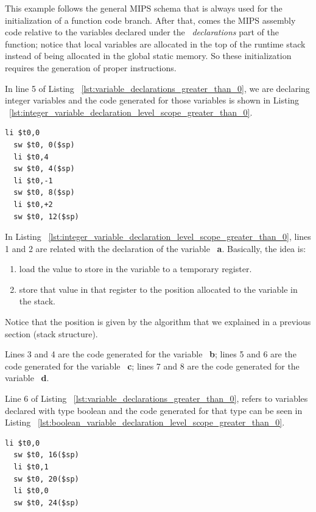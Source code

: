 \documentclass[
  oneside,
  11pt, a4paper,
  footinclude=true,
  headinclude=true,
  cleardoublepage=empty
]{scrbook}
\begin{document}
This example follows the general MIPS schema that is always used for the initialization of a function code branch. After that, comes the MIPS assembly code relative to the variables declared under the ~\textit{declarations} part of the function; notice that local variables are allocated in the top of the runtime stack instead of being allocated in the global static memory. So these initialization requires the generation of proper instructions.

In line 5 of Listing ~\ref{lst:variable_declarations_greater_than_0}, we are declaring integer variables and the code generated for those variables is shown in Listing ~\ref{lst:integer_variable_declaration_level_scope_greater_than_0}.

\begin{lstlisting}[caption={Declaring integer variables in level scope greater than 0 on MIPS.},label={lst:integer_variable_declaration_level_scope_greater_than_0}]
  li $t0,0		
  sw $t0, 0($sp)
  li $t0,4		
  sw $t0, 4($sp)
  li $t0,-1		
  sw $t0, 8($sp)
  li $t0,+2		
  sw $t0, 12($sp)
\end{lstlisting}

In Listing ~\ref{lst:integer_variable_declaration_level_scope_greater_than_0}, lines 1 and 2 are related with the declaration of the variable ~\textbf{a}. Basically, the idea is:

\begin{enumerate}
\item load the value to store in the variable to a temporary register.
\item store that value in that register to the position allocated to the variable in the stack.
\end{enumerate}

Notice that the position is given by the algorithm that we explained in a previous section (stack structure).

Lines 3 and 4 are the code generated for the variable ~\textbf{b}; lines 5 and 6 are the code generated for the variable ~\textbf{c}; lines 7 and 8 are the code generated for the variable ~\textbf{d}.

Line 6 of Listing ~\ref{lst:variable_declarations_greater_than_0}, refers to variables declared with type boolean and the code generated for that type can be seen in Listing ~\ref{lst:boolean_variable_declaration_level_scope_greater_than_0}.

\begin{lstlisting}[caption={Declaring boolean variables in scope level greater than 0},label={lst:boolean_variable_declaration_level_scope_greater_than_0}]
  li $t0,0		
  sw $t0, 16($sp)
  li $t0,1		
  sw $t0, 20($sp)
  li $t0,0		
  sw $t0, 24($sp)
\end{lstlisting}
\end{document}
